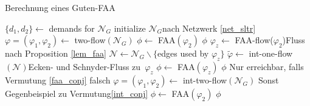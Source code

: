 \begin{algorithm}
\caption{Berechnung eines Guten-FAA}
\label{algo_gfaa}
\begin{algorithmic}[1]
	\State $\{d_1,d_2\} \gets $ demands for $\mathcal{N}_G$
	\State initialize $\mathcal{N}_G$\Comment nach Netzwerk \ref{net_sltr}
	\State $\varphi=(\varphi_1,\varphi_2) \gets $ two-flow$(\mathcal{N}_G)$\label{two_flow1}
			\State $\phi \gets $ FAA$(\varphi_2)$
			\State \Return $\phi$
		\Else
			\State $\varphi_z \gets$ FAA-flow($\varphi_2$)\Comment Fluss nach Proposition \ref{lem_faa}
			\State $\mathcal{N} \gets \mathcal{N}_G \backslash \{$edges used by $\varphi_z\}$\label{algo_check}
			\State $\tilde{\varphi} \gets $ int-one-flow$(\mathcal{N})$\Comment Ecken- und Schnyder-Fluss zu $\varphi_z$\label{int_one_flow1}
				\State $\phi \gets $ FAA$(\varphi_z)$
				\State \Return $\phi$
			\Else \Comment Nur erreichbar, falls Vermutung \ref{faa_conj} falsch\label{sanity_check}
				\State $\varphi=(\varphi_1,\varphi_2) \gets $ int-two-flow$(\mathcal{N}_G)$
				\Comment Sonst Gegenbeispiel zu Vermutung\ref{int_conj}\label{int_two_flow1}
					\State $\phi \gets $ FAA$(\varphi_2)$
					\State \Return $\phi$
				\EndIf
			\EndIf
		\EndIf
	\EndIf
\EndIf
\EndProcedure
\end{algorithmic}
\end{algorithm}
